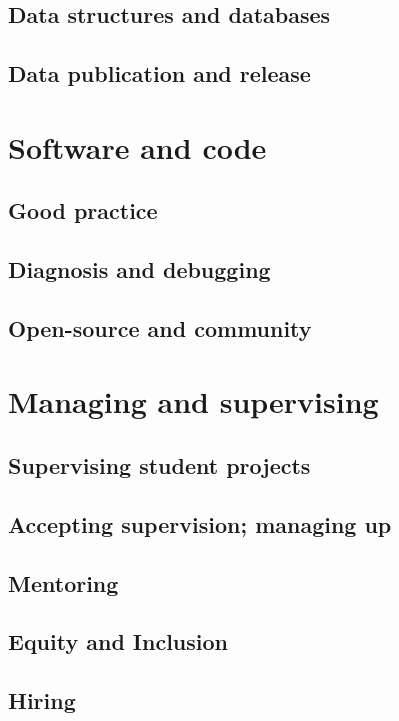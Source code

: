 \documentclass[letterpaper]{book}
\begin{document}
\chapter{Data structures and databases}

\chapter{Data publication and release}

\part{Software and code}

\chapter{Good practice}

\chapter{Diagnosis and debugging}

\chapter{Open-source and community}

\part{Managing and supervising}

\chapter{Supervising student projects}

\chapter{Accepting supervision; managing up}

\chapter{Mentoring}

\chapter{Equity and Inclusion}

\chapter{Hiring}
\end{document}
